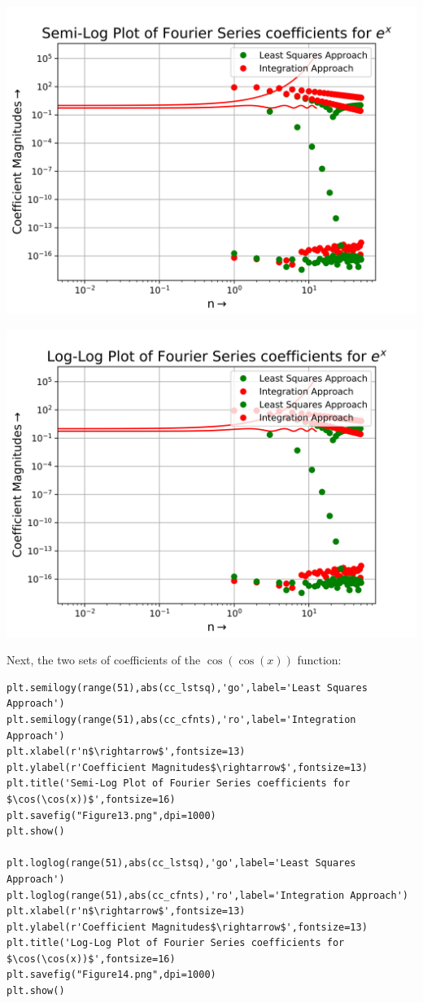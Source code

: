 \documentclass[12pt]{article}
\begin{document}
\begin{center}
    \includegraphics[scale=0.8]{images/Figure11.png}
\end{center}
\begin{center}
    \includegraphics[scale=0.8]{images/Figure12.png}
\end{center}
\pagebreak

Next, the two sets of coefficients of the $\cos(\cos(x))$ function:

\begin{lstlisting}
plt.semilogy(range(51),abs(cc_lstsq),'go',label='Least Squares Approach')
plt.semilogy(range(51),abs(cc_cfnts),'ro',label='Integration Approach')
plt.xlabel(r'n$\rightarrow$',fontsize=13)
plt.ylabel(r'Coefficient Magnitudes$\rightarrow$',fontsize=13)
plt.title('Semi-Log Plot of Fourier Series coefficients for $\cos(\cos(x))$',fontsize=16)
plt.savefig("Figure13.png",dpi=1000)
plt.show()

plt.loglog(range(51),abs(cc_lstsq),'go',label='Least Squares Approach')
plt.loglog(range(51),abs(cc_cfnts),'ro',label='Integration Approach')
plt.xlabel(r'n$\rightarrow$',fontsize=13)
plt.ylabel(r'Coefficient Magnitudes$\rightarrow$',fontsize=13)
plt.title('Log-Log Plot of Fourier Series coefficients for $\cos(\cos(x))$',fontsize=16)
plt.savefig("Figure14.png",dpi=1000)
plt.show()
\end{lstlisting}
\end{document}
